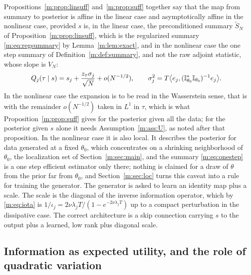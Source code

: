 \begin{remark}\label{m:rem:affine}
Propositions~\ref{m:prop:linsuff} and~\ref{m:prop:suff} together say that the map from summary to posterior is affine in the linear case and asymptotically affine in the nonlinear case, provided $s$ is, in the linear case, the preconditioned summary $\tilde S_N$ of Proposition~\ref{m:prop:linsuff}, which is the regularized summary \eqref{m:eq:regsummary} by Lemma~\ref{m:lem:exact}, and in the nonlinear case the one step summary of Definition~\ref{m:def:summary}, and not the raw adjoint statistic, whose slope is $V_N$:
\[
Q_j(\tau\mid s)=s_j+\frac{z_\tau\sigma_j}{\sqrt N}+o(N^{-1/2}),\qquad\sigma_j^2=T\big\langle e_j,(\mathbb{I}^*_{\theta_0}\mathbb{I}_{\theta_0})^{-1}e_j\big\rangle .
\]
In the nonlinear case the expansion is to be read in the Wasserstein sense, that is with the remainder $o(N^{-1/2})$ taken in $L^1$ in $\tau$, which is what Proposition~\ref{m:prop:suff} gives for the posterior given all the data; for the posterior given $s$ alone it needs Assumption~\ref{m:ass:U}, as noted after that proposition. In the nonlinear case it is also local. It describes the posterior for data generated at a fixed $\theta_0$, which concentrates on a shrinking neighborhood of $\theta_0$, the localization set of Section~\ref{m:sec:main}, and the summary \eqref{m:eq:onestep} is a one step efficient estimator only there; nothing is claimed for a draw of $\theta$ from the prior far from $\theta_0$, and Section~\ref{m:sec:loc} turns this caveat into a rule for training the generator. The generator is asked to learn an identity map plus a scale. The scale is the diagonal of the inverse information operator, which by \eqref{m:eq:iota} is $1/\iota_j=2\nu\lambda_jT/(1-e^{-2\nu\lambda_jT})$ up to a compact perturbation in the dissipative case. The correct architecture is a skip connection carrying $s$ to the output plus a learned, low rank plus diagonal scale.
\end{remark}

\subsection{Information as expected utility, and the role of quadratic variation}\label{m:sec:pr}

